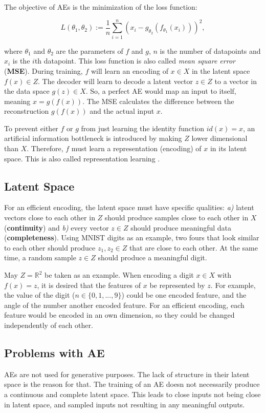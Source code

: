 \documentclass[a4paper]{IEEEtran}
\begin{document}
The objective of AEs is the minimization of the loss function:

\begin{equation}
	L(\theta_1, \theta_2) := \frac{1}{n} \sum_{i = 1}^{n}{(x_i - g_{\theta_2}(f_{\theta_1}(x_i)))^2},
	\label{mse}
\end{equation}

where $\theta_1$ and $\theta_2$ are the parameters of $f$ and $g$, $n$ is the number of datapoints and $x_i$ is the $i$th datapoint. This loss function is also called \textit{mean square error} (\textbf{MSE}). During training, $f$ will learn an encoding of $x \in X$ in the latent space $f(x) \in Z$. The decoder will learn to decode a latent vector $z \in Z$ to a vector in the data space $g(z) \in X$. So, a perfect AE would map an input to itself, meaning $x = g(f(x))$. The MSE calculates the difference between the reconstruction $g(f(x))$ and the actual input $x$.

To prevent either $f$ or $g$ from just learning the identity function $id(x) = x$, an artificial information bottleneck is introduced by making $Z$ lower dimensional than $X$. Therefore, $f$ must learn a representation (encoding) of $x$ in its latent space. This is also called representation learning \cite{DBLP:journals/corr/abs-1206-5538}. 

\subsection{Latent Space}
For an efficient encoding, the latent space must have specific qualities: \textit{a)} latent vectors close to each other in $Z$ should produce samples close to each other in $X$ (\textbf{continuity}) and \textit{b)} every vector $z \in Z$ should produce meaningful data (\textbf{completeness}). Using MNIST digits as an example, two fours that look similar to each other should produce $z_1, z_2 \in Z$ that are close to each other. At the same time, a random sample $z \in Z$ should produce a meaningful digit.

May $Z = \mathbb{R}^{2}$ be taken as an example. When encoding a digit $x \in X$ with $f(x) = z$, it is desired that the features of $x$ be represented by $z$. For example, the value of the digit ($n \in \{0,1,...,9\}$) could be one encoded feature, and the angle of the number another encoded feature. For an efficient encoding, each feature would be encoded in an own dimension, so they could be changed independently of each other.

\subsection{Problems with AE}
AEs are not used for generative purposes. The lack of structure in their latent space is the reason for that. The training of an AE doesn not necessarily produce a continuous and complete latent space. This leads to close inputs not being close in latent space, and sampled inputs not resulting in any meaningful outputs.
\end{document}
